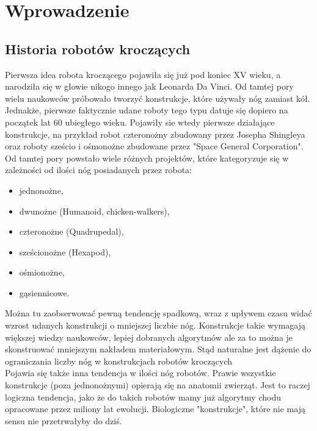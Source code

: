 \chapter{Wprowadzenie}
\label{cha:wprowadzenie}
\section{Historia robotów kroczących}
Pierwsza idea robota kroczącego pojawiła się już pod koniec XV wieku, a narodziła się w głowie nikogo innego jak Leonarda Da Vinci. Od tamtej pory wielu naukowców próbowało tworzyć konstrukcje, które używały nóg zamiast kół. Jednakże, pierwsze faktycznie udane roboty tego typu datuje się dopiero na początek lat 60 ubiegłego wieku. Pojawiły sie wtedy pierwsze działające konstrukcje, na przykład robot czteronożny zbudowany przez Josepha Shingleya oraz roboty sześcio i ośmonożne zbudowane przez "Space General Corporation". \cite{history}\\

Od tamtej pory powstało wiele różnych projektów, które kategoryzuje się w zależności od ilości nóg posiadanych przez robota:
\begin{itemize}[noitemsep]
\item jednonożne,
\item dwunożne (Humanoid, chicken-walkers),
\item czteronożne (Quadrupedal),
\item sześcionożne (Hexapod),
\item ośmionożne,
\item gąsiennicowe.
\end{itemize}

Można tu zaobserwować pewną tendencję spadkową, wraz z upływem czasu widać wzrost udanych konstrukcji o mniejszej liczbie nóg. Konstrukcje takie wymagają większej wiedzy naukowców, lepiej dobranych algorytmów ale za to można je skonstruować mniejszym nakładem materiałowym. Stąd naturalne jest dążenie do ograniczania liczby nóg w konstrukcjach robotów kroczących\\

Pojawia się także inna tendencja w ilości nóg robotów. Prawie wszystkie konstrukcje (poza jednonożnymi) opierają się na anatomii zwierząt. Jest to raczej logiczna tendencja, jako że do takich robotów mamy już algorytmy chodu opracowane przez miliony lat ewolucji. Biologiczne "konstrukcje", które nie mają sensu nie przetrwałyby do dziś. \cite{history}\\

